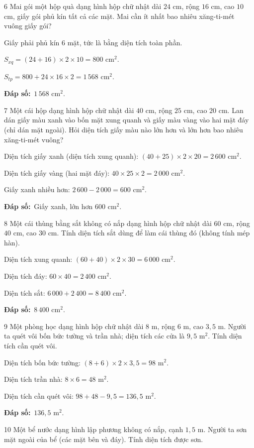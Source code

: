 \documentclass[11pt]{article}
\newif\ifsol \solfalse
\providecommand{\AnsWord}{Đáp số}
\newcommand{\dapso}[1]{\par\textbf{\AnsWord:}\ #1}
\newcommand{\probsol}[1]{%
  \begin{lrbox}{\solmeasure}\begin{minipage}{\dimexpr\linewidth-24pt\relax}#1\end{minipage}\end{lrbox}%
  \ifsol
    \begin{solbox}#1\end{solbox}%
  \else
    \setlength{\solht}{\dimexpr\ht\solmeasure+\dp\solmeasure+0.85cm\relax}%
    \ifdim\solht<1.35cm\setlength{\solht}{1.35cm}\fi
    \begin{tcolorbox}[colback=white,colframe=Line,boxrule=0.8pt,arc=5pt,
      left=8pt,right=8pt,top=4pt,bottom=4pt,height=\solht]{\footnotesize\color{Slate}\itshape\WorkWord}\end{tcolorbox}%
  \fi}
\newcommand{\gap}{\vspace{0.3cm}}
\def\WorkWord{Bài làm:}
\def\AnsWord{Đáp số}
\begin{document}
\gap
\begin{probbox}{6}{\relax}
Mai gói một hộp quà dạng hình hộp chữ nhật dài $24$ cm, rộng $16$ cm, cao $10$ cm, giấy gói phủ kín tất cả các mặt. Mai cần ít nhất bao nhiêu xăng-ti-mét vuông giấy gói?
\end{probbox}
\probsol{
Giấy phải phủ kín $6$ mặt, tức là bằng diện tích toàn phần.\par
$S_{xq}=(24+16)\times2\times10=800$ cm$^2$.\par
$S_{tp}=800+24\times16\times2=1\,568$ cm$^2$.
\dapso{$1\,568$ cm$^2$.}}
\gap
\begin{probbox}{7}{\relax}
Một cái hộp dạng hình hộp chữ nhật dài $40$ cm, rộng $25$ cm, cao $20$ cm. Lan dán giấy màu xanh vào bốn mặt xung quanh và giấy màu vàng vào hai mặt đáy (chỉ dán mặt ngoài). Hỏi diện tích giấy màu nào lớn hơn và lớn hơn bao nhiêu xăng-ti-mét vuông?
\end{probbox}
\probsol{
Diện tích giấy xanh (diện tích xung quanh): $(40+25)\times2\times20=2\,600$ cm$^2$.\par
Diện tích giấy vàng (hai mặt đáy): $40\times25\times2=2\,000$ cm$^2$.\par
Giấy xanh nhiều hơn: $2\,600-2\,000=600$ cm$^2$.
\dapso{Giấy xanh, lớn hơn $600$ cm$^2$.}}
\gap
\begin{probbox}{8}{\relax}
Một cái thùng bằng sắt không có nắp dạng hình hộp chữ nhật dài $60$ cm, rộng $40$ cm, cao $30$ cm. Tính diện tích sắt dùng để làm cái thùng đó (không tính mép hàn).
\end{probbox}
\probsol{
Diện tích xung quanh: $(60+40)\times2\times30=6\,000$ cm$^2$.\par
Diện tích đáy: $60\times40=2\,400$ cm$^2$.\par
Diện tích sắt: $6\,000+2\,400=8\,400$ cm$^2$.
\dapso{$8\,400$ cm$^2$.}}
\gap
\begin{probbox}{9}{\relax}
Một phòng học dạng hình hộp chữ nhật dài $8$ m, rộng $6$ m, cao $3{,}5$ m. Người ta quét vôi bốn bức tường và trần nhà; diện tích các cửa là $9{,}5$ m$^2$. Tính diện tích cần quét vôi.
\end{probbox}
\probsol{
Diện tích bốn bức tường: $(8+6)\times2\times3{,}5=98$ m$^2$.\par
Diện tích trần nhà: $8\times6=48$ m$^2$.\par
Diện tích cần quét vôi: $98+48-9{,}5=136{,}5$ m$^2$.
\dapso{$136{,}5$ m$^2$.}}
\gap
\begin{probbox}{10}{\relax}
Một bể nước dạng hình lập phương không có nắp, cạnh $1{,}5$ m. Người ta sơn mặt ngoài của bể (các mặt bên và đáy). Tính diện tích được sơn.
\end{probbox}
\end{document}
